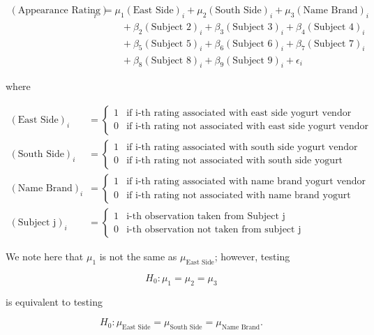 \documentclass[]{book}
\theoremstyle{plain}
\theoremstyle{mydefn}
\theoremstyle{myexmpl}
\theoremstyle{remark}
\begin{document}
\[
\begin{aligned}
  (\text{Appearance Rating})_i &= \mu_1 (\text{East Side})_i + \mu_2 (\text{South Side})_i + \mu_3 (\text{Name Brand})_i \\
    &\qquad + \beta_2 (\text{Subject 2})_i + \beta_3 (\text{Subject 3})_i + \beta_4 (\text{Subject 4})_i \\
    &\qquad + \beta_5 (\text{Subject 5})_i + \beta_6 (\text{Subject 6})_i + \beta_7 (\text{Subject 7})_i \\
    &\qquad + \beta_8 (\text{Subject 8})_i + \beta_9 (\text{Subject 9})_i + \epsilon_i
\end{aligned}
\]

where

\[
\begin{aligned}
  (\text{East Side})_i &= \begin{cases}
    1 & \text{if i-th rating associated with east side yogurt vendor} \\
    0 & \text{if i-th rating not associated with east side yogurt vendor}
    \end{cases} \\
  (\text{South Side})_i &= \begin{cases}
    1 & \text{if i-th rating associated with south side yogurt vendor} \\
    0 & \text{if i-th rating not associated with south side yogurt vendor}
    \end{cases} \\
  (\text{Name Brand})_i &= \begin{cases}
    1 & \text{if i-th rating associated with name brand yogurt vendor} \\
    0 & \text{if i-th rating not associated with name brand yogurt vendor}
    \end{cases} \\
  (\text{Subject j})_i &= \begin{cases}
  1 & \text{i-th observation taken from Subject j} \\
  0 & \text{i-th observation not taken from subject j}
  \end{cases}
\end{aligned}
\]

We note here that \(\mu_1\) is not the same as
\(\mu_{\text{East Side}}\); however, testing

\[H_0: \mu_1 = \mu_2 = \mu_3\]

is equivalent to testing

\[H_0: \mu_{\text{East Side}} = \mu_{\text{South Side}} = \mu_{\text{Name Brand}}.\]
\end{document}
